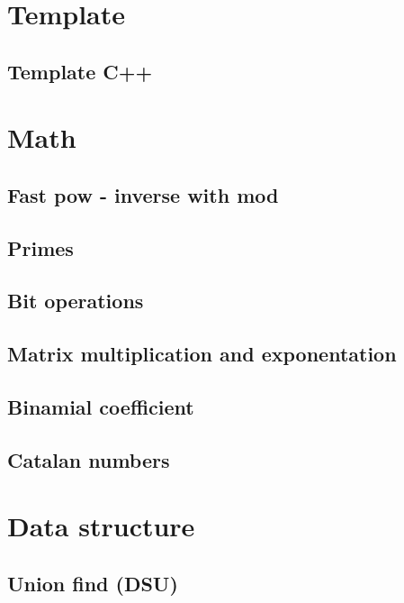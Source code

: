 \section{Template}
\subsection{Template C++}
\raggedbottom
\hrulefill

\section{Math}
\subsection{Fast pow - inverse with mod}
\raggedbottom
\hrulefill
\subsection{Primes}
\raggedbottom
\hrulefill
\subsection{Bit operations}
\raggedbottom
\hrulefill
\subsection{Matrix multiplication and exponentation}
\raggedbottom
\hrulefill
\subsection{Binamial coefficient}
\raggedbottom
\hrulefill
\subsection{Catalan numbers}
\raggedbottom
\hrulefill

\section{Data structure}
\subsection{Union find (DSU)}
\raggedbottom
\hrulefill
